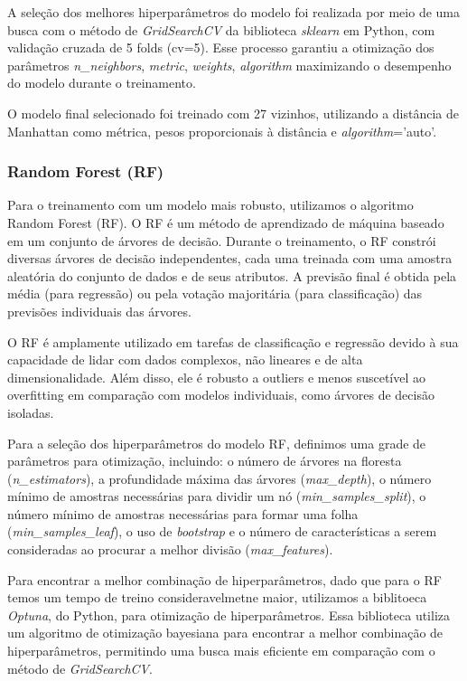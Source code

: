 A seleção dos melhores hiperparâmetros do modelo foi realizada por meio de uma busca com o método de \textit{GridSearchCV} da biblioteca \textit{sklearn} em Python, com validação cruzada de 5 folds (cv=5). Esse processo garantiu a otimização dos parâmetros \textit{n\_neighbors}, \textit{metric}, \textit{weights}, \textit{algorithm} maximizando o desempenho do modelo durante o treinamento.

O modelo final selecionado foi treinado com 27 vizinhos, utilizando a distância de Manhattan como métrica, pesos proporcionais à distância e \textit{algorithm}='auto'.

\subsubsection*{Random Forest (RF)}\label{subsubsec:rf}
Para o treinamento com um modelo mais robusto, utilizamos o algoritmo Random Forest (RF). O \ac{RF} é um método de aprendizado de máquina baseado em um conjunto de árvores de decisão. Durante o treinamento, o \ac{RF} constrói diversas árvores de decisão independentes, cada uma treinada com uma amostra aleatória do conjunto de dados e de seus atributos. A previsão final é obtida pela média (para regressão) ou pela votação majoritária (para classificação) das previsões individuais das árvores.

O RF é amplamente utilizado em tarefas de classificação e regressão devido à sua capacidade de lidar com dados complexos, não lineares e de alta dimensionalidade. Além disso, ele é robusto a outliers e menos suscetível ao overfitting em comparação com modelos individuais, como árvores de decisão isoladas.

Para a seleção dos hiperparâmetros do modelo RF, definimos uma grade de parâmetros para otimização, incluindo: o número de árvores na floresta (\textit{n\_estimators}), a profundidade máxima das árvores (\textit{max\_depth}), o número mínimo de amostras necessárias para dividir um nó (\textit{min\_samples\_split}), o número mínimo de amostras necessárias para formar uma folha (\textit{min\_samples\_leaf}), o uso de \textit{bootstrap} e o número de características a serem consideradas ao procurar a melhor divisão (\textit{max\_features}).

Para encontrar a melhor combinação de hiperparâmetros, dado que para o RF temos um tempo de treino consideravelmetne maior, utilizamos a biblitoeca \textit{Optuna}, do Python, para otimização de hiperparâmetros. Essa biblioteca utiliza um algoritmo de otimização bayesiana para encontrar a melhor combinação de hiperparâmetros, permitindo uma busca mais eficiente em comparação com o método de \textit{GridSearchCV}.

